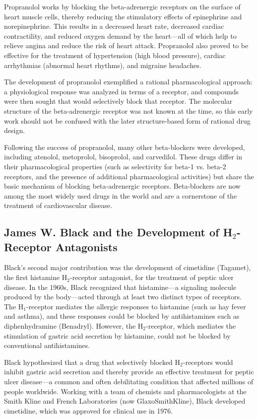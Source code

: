Propranolol works by blocking the beta-adrenergic receptors on the surface of heart muscle cells, thereby reducing the stimulatory effects of epinephrine and norepinephrine. This results in a decreased heart rate, decreased cardiac contractility, and reduced oxygen demand by the heart---all of which help to relieve angina and reduce the risk of heart attack. Propranolol also proved to be effective for the treatment of hypertension (high blood pressure), cardiac arrhythmias (abnormal heart rhythms), and migraine headaches.

The development of propranolol exemplified a rational pharmacological approach: a physiological response was analyzed in terms of a receptor, and compounds were then sought that would selectively block that receptor. The molecular structure of the beta-adrenergic receptor was not known at the time, so this early work should not be confused with the later structure-based form of rational drug design.

Following the success of propranolol, many other beta-blockers were developed, including atenolol, metoprolol, bisoprolol, and carvedilol. These drugs differ in their pharmacological properties (such as selectivity for beta-1 vs. beta-2 receptors, and the presence of additional pharmacological activities) but share the basic mechanism of blocking beta-adrenergic receptors. Beta-blockers are now among the most widely used drugs in the world and are a cornerstone of the treatment of cardiovascular disease.

\subsection{James W. Black and the Development of H\texorpdfstring{$_2$}{2}-Receptor Antagonists}

Black's second major contribution was the development of cimetidine (Tagamet), the first histamine H$_2$-receptor antagonist, for the treatment of peptic ulcer disease. In the 1960s, Black recognized that histamine---a signaling molecule produced by the body---acted through at least two distinct types of receptors. The H$_1$-receptor mediates the allergic responses to histamine (such as hay fever and asthma), and these responses could be blocked by antihistamines such as diphenhydramine (Benadryl). However, the H$_2$-receptor, which mediates the stimulation of gastric acid secretion by histamine, could not be blocked by conventional antihistamines.

Black hypothesized that a drug that selectively blocked H$_2$-receptors would inhibit gastric acid secretion and thereby provide an effective treatment for peptic ulcer disease---a common and often debilitating condition that affected millions of people worldwide. Working with a team of chemists and pharmacologists at the Smith Kline and French Laboratories (now GlaxoSmithKline), Black developed cimetidine, which was approved for clinical use in 1976.

